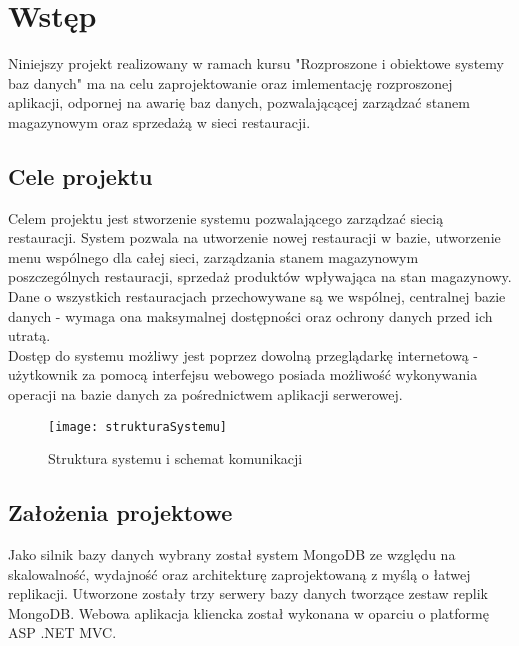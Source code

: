 \section{Wstęp}
Niniejszy projekt realizowany w ramach kursu "Rozproszone i obiektowe systemy baz danych" ma na celu zaprojektowanie oraz imlementację rozproszonej aplikacji, odpornej na awarię baz danych, pozwalającącej zarządzać stanem magazynowym oraz sprzedażą w sieci restauracji.

\subsection{Cele projektu}
Celem projektu jest stworzenie systemu pozwalającego zarządzać siecią restauracji. System pozwala na utworzenie nowej restauracji w bazie, utworzenie menu wspólnego dla całej sieci, zarządzania stanem magazynowym poszczególnych restauracji, sprzedaż produktów wpływająca na stan magazynowy. Dane o wszystkich restauracjach przechowywane są we wspólnej, centralnej bazie danych - wymaga ona maksymalnej dostępności oraz ochrony danych przed ich utratą. \\
Dostęp do systemu możliwy jest poprzez dowolną przeglądarkę internetową - użytkownik za pomocą interfejsu webowego posiada możliwość wykonywania operacji na bazie danych za pośrednictwem aplikacji serwerowej.


\begin{figure}[H]
	\centering
	\texttt{[image: strukturaSystemu]}
	\caption{Struktura systemu i schemat komunikacji}
\end{figure}


\subsection{Założenia projektowe}
Jako silnik bazy danych wybrany został system MongoDB ze względu na skalowalność, wydajność oraz architekturę zaprojektowaną z myślą o łatwej replikacji. Utworzone zostały trzy serwery bazy danych tworzące zestaw replik MongoDB. Webowa aplikacja kliencka został wykonana w oparciu o platformę ASP .NET MVC. 

